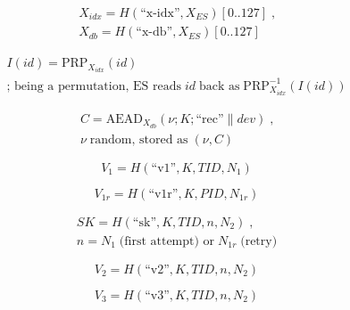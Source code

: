 \begin{multline*}\tag{E0}\label{eq:E0} X_{idx} = H(\text{``x-idx''}, X_{ES})[0..127]\;\text{,} \\ X_{db} = H(\text{``x-db''}, X_{ES})[0..127] \end{multline*}
\par
\begin{multline*}\tag{E1}\label{eq:E1} I(id) = \mathrm{PRP}_{X_{idx}}(id) \\ \text{; being a permutation, ES reads}\;id\;\text{back as}\;\mathrm{PRP}^{-1}_{X_{idx}}(I(id)) \end{multline*}
\par
\begin{multline*}\tag{E2}\label{eq:E2} C = \mathrm{AEAD}_{X_{db}}(\nu ; K; \text{``rec''}  \|  dev)\;\text{,} \\ \nu \;\text{random, stored as}\;(\nu , C) \end{multline*}
\par
\begin{equation*}\tag{E3}\label{eq:E3} V_1 = H(\text{``v1''}, K, TID, N_1) \end{equation*}
\par
\begin{equation*}\tag{E3r}\label{eq:E3r} V_{1r} = H(\text{``v1r''}, K, PID, N_{1r}) \end{equation*}
\par
\begin{multline*}\tag{E4}\label{eq:E4} SK = H(\text{``sk''}, K, TID, n, N_2)\;\text{,} \\ n\;\text{=}\;N_1\;\text{(first attempt) or}\;N_{1r}\;\text{(retry)} \end{multline*}
\par
\begin{equation*}\tag{E5}\label{eq:E5} V_2 = H(\text{``v2''}, K, TID, n, N_2) \end{equation*}
\par
\begin{equation*}\tag{E6}\label{eq:E6} V_3 = H(\text{``v3''}, K, TID, n, N_2) \end{equation*}
